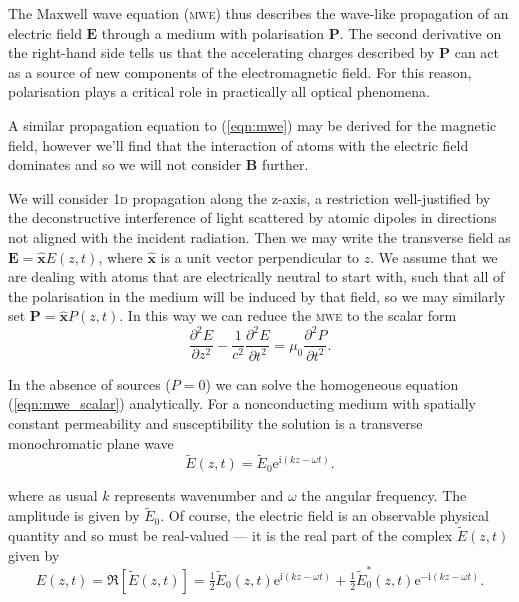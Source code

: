     The Maxwell wave equation (\textsc{mwe}) thus describes the wave-like
    propagation of an electric field $\mathbf{E}$ through a medium with
    polarisation $\mathbf{P}$. The second derivative on the right-hand side
    tells us that the accelerating charges described by $\mathbf{P}$ can act as
    a source of new components of the electromagnetic field. For this reason,
    polarisation plays a critical role in practically all optical
    phenomena.\cite{boyd2008nonlinear}

    A similar propagation equation to (\ref{eqn:mwe}) may be derived for the
    magnetic field, however we'll find that the interaction of atoms with the
    electric field dominates and so we will not consider $\mathbf{B}$ further.

    We will consider \textsc{1d} propagation along the z-axis, a restriction
    well-justified by the deconstructive interference of light scattered by
    atomic dipoles in directions not aligned with the incident
    radiation\cite{hecht2015optics}. Then we may write the transverse field as
    $\mathbf{E} = \hat{\mathbf{x}} E(z, t)$, where $\hat{\mathbf{x}}$ is a unit
    vector perpendicular to $z$. We assume that we are dealing with atoms that
    are electrically neutral to start with, such that all of the polarisation in
    the medium will be induced by that field, so we may similarly set
    $\mathbf{P} = \hat{\mathbf{x}} P(z, t)$. In this way we can reduce the
    \textsc{mwe} to the scalar form
    \begin{equation}
      \frac{\partial^2 E}{\partial z^2} - \frac{1}{c^2} \frac{\partial^2
        E}{\partial t^2} =    \mu_0 \frac{\partial^2 P}{\partial t^2}.
      \label{eqn:mwe_scalar} 
    \end{equation}

    In the absence of sources (\ie $P = 0$) we can solve the homogeneous
    equation (\ref{eqn:mwe_scalar}) analytically. For a nonconducting medium
    with spatially constant permeability and susceptibility the solution is a
    transverse monochromatic plane wave\cite{jackson1998classical}
    \begin{equation}
      \tilde{E}(z,t) = \tilde{E}_0 \mathrm{e}^{\mathrm{i}(k z - \omega t)}.
      \label{eqn:plane_waves}
    \end{equation}

    where as usual $k$ represents wavenumber and $\omega$ the angular frequency.
    The amplitude is given by $\tilde{E}_0$. Of course, the electric field is an
    observable physical quantity and so must be real-valued --- it is the real
    part of the complex $\tilde{E}(z,t)$ given by
    \begin{equation}
      E(z,t) = \Re[\tilde{E}(z,t)] = \tfrac{1}{2} \tilde{E}_0(z,t) 
                    \mathrm{e}^{\mathrm{i}(k z - \omega t)} 
                + \tfrac{1}{2} \tilde{E}_0^*(z,t) 
                    \mathrm{e}^{-\mathrm{i}(k z - \omega t)}.
    \end{equation}

